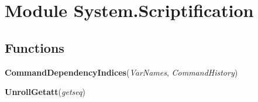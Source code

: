 %
%
%


\section{Module System.Scriptification}

    \label{System:Scriptification}


  \subsection{Functions}

    \label{System:Scriptification:CommandDependencyIndices}

    \vspace{0.5ex}

\hspace{.8\funcindent}\begin{boxedminipage}{\funcwidth}

    \raggedright \textbf{CommandDependencyIndices}(\textit{VarNames}, \textit{CommandHistory})

\setlength{\parskip}{2ex}
\setlength{\parskip}{1ex}
    \end{boxedminipage}

    \label{System:Scriptification:UnrollGetatt}

    \vspace{0.5ex}

\hspace{.8\funcindent}\begin{boxedminipage}{\funcwidth}

    \raggedright \textbf{UnrollGetatt}(\textit{getseq})

\setlength{\parskip}{2ex}
\setlength{\parskip}{1ex}
    \end{boxedminipage}

